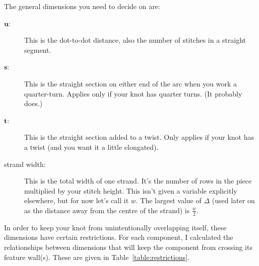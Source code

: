 \documentclass[openany]{book}
\begin{document}
The general dimensions you need to decide on are:
\begin{description}
\item[$\mathbf u$:] This is the dot-to-dot distance, also the number of stitches in a straight segment.
\item[$\mathbf s$:] This is the straight section on either end of the arc when you work a quarter-turn. Applies only if your knot has quarter turns. (It probably does.)
\item[$\mathbf t$:] This is the straight section added to a twist. Only applies if your knot has a twist (and you want it a little elongated).
\item[strand width:] This is the total width of one strand. It's the number of rows in the piece multiplied by your stitch height. This isn't given a variable explicitly elsewhere, but for now let's call it $w$. The largest value of $\Delta$ (used later on as the distance away from the centre of the strand) is $\frac{w}{2}$.
\end{description}

In order to keep your knot from unintentionally overlapping itself, these dimensions have certain restrictions. For each component, I calculated the relationships between dimensions that will keep the component from crossing its feature wall(s). These are given in Table~\ref{table:restrictions}.
\end{document}
